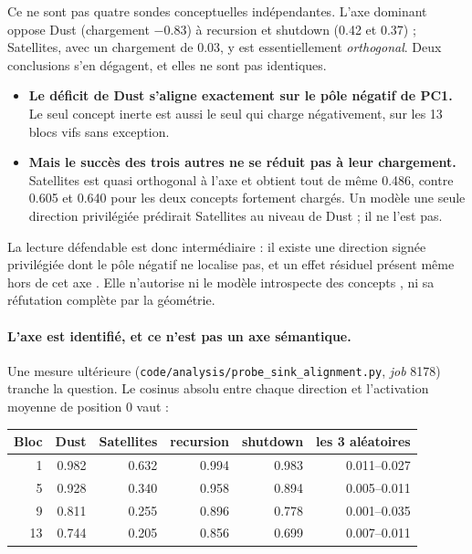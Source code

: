 \documentclass[11pt,a4paper]{article}
\newcommand{\code}[1]{\texttt{\small #1}}
\begin{document}
\noindent
Ce ne sont pas quatre sondes conceptuelles indépendantes. L'axe dominant oppose Dust
(chargement \num{-0.83}) à recursion et shutdown (\num{+0.42} et \num{+0.37}) ;
Satellites, avec un chargement de \num{0.03}, y est essentiellement \emph{orthogonal}.
Deux conclusions s'en dégagent, et elles ne sont pas identiques.

\begin{itemize}
\item \textbf{Le déficit de Dust s'aligne exactement sur le pôle négatif de PC1.} Le
      seul concept inerte est aussi le seul qui charge négativement, sur les 13 blocs
      vifs sans exception.
\item \textbf{Mais le succès des trois autres ne se réduit pas à leur chargement.}
      Satellites est quasi orthogonal à l'axe et obtient tout de même \num{0.486}, contre
      \num{0.605} et \num{0.640} pour les deux concepts fortement chargés. Un modèle
      \og une seule direction privilégiée \fg{} prédirait Satellites au niveau de Dust ;
      il ne l'est pas.
\end{itemize}

\noindent
La lecture défendable est donc intermédiaire : \og il existe une direction signée
privilégiée dont le pôle négatif ne localise pas, et un effet résiduel présent même hors
de cet axe \fg. Elle n'autorise ni \og le modèle introspecte des concepts \fg, ni sa
réfutation complète par la géométrie.

\paragraph{L'axe est identifié, et ce n'est pas un axe sémantique.} Une mesure
ultérieure (\code{code/analysis/probe\_sink\_alignment.py}, \emph{job} \num{8178})
tranche la question. Le cosinus absolu entre chaque direction et l'activation moyenne de
position 0 vaut :

\begin{center}
\begin{tabular}{rrrrrr}
\toprule
Bloc & Dust & Satellites & recursion & shutdown & les 3 aléatoires \\
\midrule
1  & \num{0.982} & \num{0.632} & \num{0.994} & \num{0.983} & \num{0.011}--\num{0.027} \\
5  & \num{0.928} & \num{0.340} & \num{0.958} & \num{0.894} & \num{0.005}--\num{0.011} \\
9  & \num{0.811} & \num{0.255} & \num{0.896} & \num{0.778} & \num{0.001}--\num{0.035} \\
13 & \num{0.744} & \num{0.205} & \num{0.856} & \num{0.699} & \num{0.007}--\num{0.011} \\
\bottomrule
\end{tabular}
\end{center}
\end{document}
